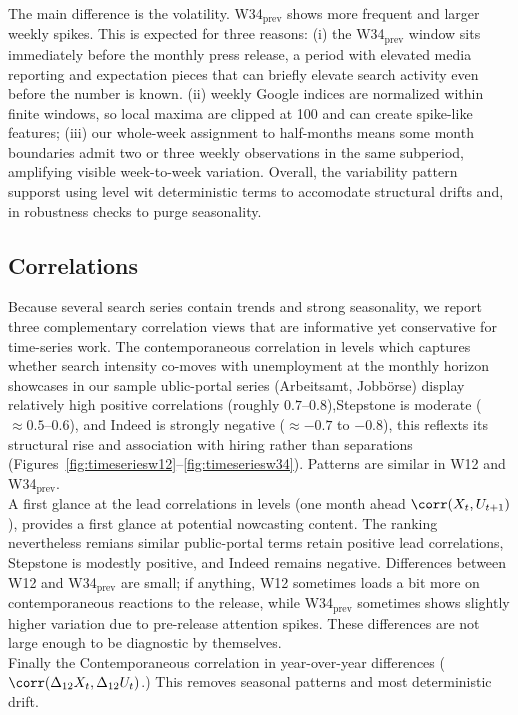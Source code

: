 \documentclass[12pt,a4paper]{article}
\begin{document}
The main difference is the volatility. 
W34$_{\text{prev}}$ shows more frequent and larger weekly spikes. This is expected for three reasons:
(i) the W34$_{\text{prev}}$ window sits immediately before the monthly press release, a period with elevated media reporting and expectation pieces that can briefly elevate search activity even before the number is known.
(ii) weekly Google indices are normalized within finite windows, so local maxima are clipped at 100 and can create spike-like features;
(iii) our whole-week assignment to half-months means some month boundaries admit two or three weekly observations in the same subperiod, amplifying visible week-to-week variation.
Overall, the variability pattern supporst using level wit deterministic terms to accomodate structural drifts and, in robustness checks to purge seasonality. 
\subsection{Correlations}
Because several search series contain trends and strong seasonality, we report three complementary correlation views that are informative yet conservative for time-series work.
The contemporaneous correlation in levels which captures whether search intensity co-moves with unemployment at the monthly horizon showcases in our sample ublic-portal series (Arbeitsamt, Jobbörse) display relatively high positive correlations (roughly $0.7$--$0.8$),Stepstone is moderate ($\approx 0.5$--$0.6$), and Indeed is strongly negative ($\approx -0.7$ to $-0.8$), this reflexts its structural rise and association with hiring rather than separations (Figures~\ref{fig:timeseriesw12}--\ref{fig:timeseriesw34}). Patterns are similar in W12 and W34$_{\text{prev}}$.\\
A first glance at the lead correlations in levels (one month ahead $\corr(X_t, U_{t+1})$), provides a first glance at potential nowcasting content.
The ranking nevertheless remians similar public-portal terms retain positive lead correlations, Stepstone is modestly positive, and Indeed remains negative. Differences between W12 and W34$_{\text{prev}}$ are small; 
if anything, W12 sometimes loads a bit more on contemporaneous reactions to the release, while W34$_{\text{prev}}$ sometimes shows slightly higher variation due to pre-release attention spikes. These differences are not large enough to be diagnostic by themselves.\\
Finally the Contemporaneous correlation in year-over-year differences ($\corr(\Delta_{12}X_t, \Delta_{12}U_t)$.) This removes seasonal patterns and most deterministic drift. 
\end{document}
